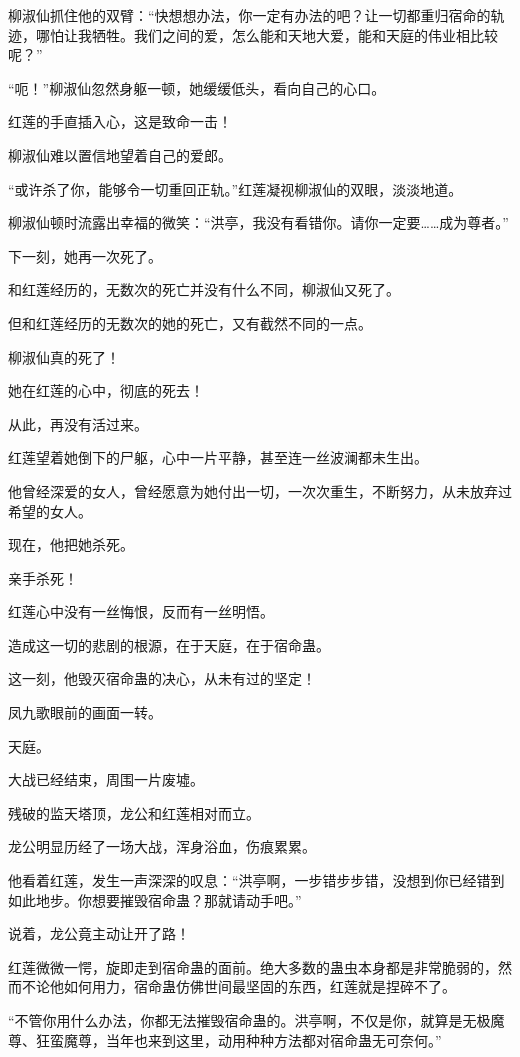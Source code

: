 \begin{this_body}
柳淑仙抓住他的双臂：“快想想办法，你一定有办法的吧？让一切都重归宿命的轨迹，哪怕让我牺牲。我们之间的爱，怎么能和天地大爱，能和天庭的伟业相比较呢？”

“呃！”柳淑仙忽然身躯一顿，她缓缓低头，看向自己的心口。

红莲的手直插入心，这是致命一击！

柳淑仙难以置信地望着自己的爱郎。

“或许杀了你，能够令一切重回正轨。”红莲凝视柳淑仙的双眼，淡淡地道。

柳淑仙顿时流露出幸福的微笑：“洪亭，我没有看错你。请你一定要……成为尊者。”

下一刻，她再一次死了。

和红莲经历的，无数次的死亡并没有什么不同，柳淑仙又死了。

但和红莲经历的无数次的她的死亡，又有截然不同的一点。

柳淑仙真的死了！

她在红莲的心中，彻底的死去！

从此，再没有活过来。

红莲望着她倒下的尸躯，心中一片平静，甚至连一丝波澜都未生出。

他曾经深爱的女人，曾经愿意为她付出一切，一次次重生，不断努力，从未放弃过希望的女人。

现在，他把她杀死。

亲手杀死！

红莲心中没有一丝悔恨，反而有一丝明悟。

造成这一切的悲剧的根源，在于天庭，在于宿命蛊。

这一刻，他毁灭宿命蛊的决心，从未有过的坚定！

凤九歌眼前的画面一转。

天庭。

大战已经结束，周围一片废墟。

残破的监天塔顶，龙公和红莲相对而立。

龙公明显历经了一场大战，浑身浴血，伤痕累累。

他看着红莲，发生一声深深的叹息：“洪亭啊，一步错步步错，没想到你已经错到如此地步。你想要摧毁宿命蛊？那就请动手吧。”

说着，龙公竟主动让开了路！

红莲微微一愕，旋即走到宿命蛊的面前。绝大多数的蛊虫本身都是非常脆弱的，然而不论他如何用力，宿命蛊仿佛世间最坚固的东西，红莲就是捏碎不了。

“不管你用什么办法，你都无法摧毁宿命蛊的。洪亭啊，不仅是你，就算是无极魔尊、狂蛮魔尊，当年也来到这里，动用种种方法都对宿命蛊无可奈何。”


\end{this_body}

